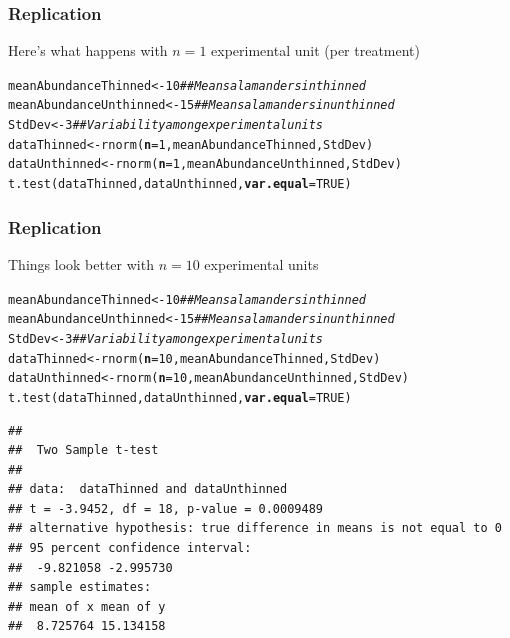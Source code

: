 \documentclass[color=usenames,dvipsnames]{beamer}\usepackage[]{graphicx}\usepackage[]{color}
\makeatletter
\newcommand{\hlnum}[1]{\textcolor[rgb]{0.69,0.494,0}{#1}}%
\newcommand{\hlcom}[1]{\textcolor[rgb]{0.514,0.506,0.514}{\textit{#1}}}%
\newcommand{\hlstd}[1]{\textcolor[rgb]{0,0,0}{#1}}%
\newcommand{\hlkwb}[1]{\textcolor[rgb]{0,0.341,0.682}{#1}}%
\newcommand{\hlkwc}[1]{\textcolor[rgb]{0,0,0}{\textbf{#1}}}%
\newcommand{\hlkwd}[1]{\textcolor[rgb]{0.004,0.004,0.506}{#1}}%
\newenvironment{kframe}{%
 \def\at@end@of@kframe{}%
 \ifinner\ifhmode%
  \def\at@end@of@kframe{\end{minipage}}%
  \begin{minipage}{\columnwidth}%
 \fi\fi%
 \def\FrameCommand##1{\hskip\@totalleftmargin \hskip-\fboxsep
 \colorbox{shadecolor}{##1}\hskip-\fboxsep
     \hskip-\linewidth \hskip-\@totalleftmargin \hskip\columnwidth}%
 \MakeFramed {\advance\hsize-\width
   \@totalleftmargin\z@ \linewidth\hsize
   \@setminipage}}%
 {\par\unskip\endMakeFramed%
 \at@end@of@kframe}
\newenvironment{knitrout}{}{} %
\makeatother
\begin{document}
\begin{frame}[fragile]
  \frametitle{Replication}
  Here's what happens with $n=1$ experimental unit (per treatment) \\
\begin{knitrout}\scriptsize
{}\color{fgcolor}\begin{kframe}
\begin{alltt}
\hlstd{meanAbundanceThinned} \hlkwb{<-} \hlnum{10}      \hlcom{## Mean salamanders in thinned}
\hlstd{meanAbundanceUnthinned} \hlkwb{<-} \hlnum{15}    \hlcom{## Mean salamanders in unthinned}
\hlstd{StdDev} \hlkwb{<-} \hlnum{3}                     \hlcom{## Variability among experimental units}
\hlstd{dataThinned} \hlkwb{<-} \hlkwd{rnorm}\hlstd{(}\hlkwc{n}\hlstd{=}\hlnum{1}\hlstd{, meanAbundanceThinned, StdDev)}
\hlstd{dataUnthinned} \hlkwb{<-} \hlkwd{rnorm}\hlstd{(}\hlkwc{n}\hlstd{=}\hlnum{1}\hlstd{, meanAbundanceUnthinned, StdDev)}
\hlkwd{t.test}\hlstd{(dataThinned, dataUnthinned,} \hlkwc{var.equal}\hlstd{=}\hlnum{TRUE}\hlstd{)}
\end{alltt}


{\ttfamily\noindent\bfseries\color{errorcolor}{\#\# Error in t.test.default(dataThinned, dataUnthinned, var.equal = TRUE): not enough observations}}\end{kframe}
\end{knitrout}
\end{frame}




\begin{frame}[fragile]
  \frametitle{Replication}
  Things look better with $n=10$ experimental units \\
\begin{knitrout}\scriptsize
{}\color{fgcolor}\begin{kframe}
\begin{alltt}
\hlstd{meanAbundanceThinned} \hlkwb{<-} \hlnum{10}      \hlcom{## Mean salamanders in thinned}
\hlstd{meanAbundanceUnthinned} \hlkwb{<-} \hlnum{15}    \hlcom{## Mean salamanders in unthinned}
\hlstd{StdDev} \hlkwb{<-} \hlnum{3}                     \hlcom{## Variability among experimental units}
\hlstd{dataThinned} \hlkwb{<-} \hlkwd{rnorm}\hlstd{(}\hlkwc{n}\hlstd{=}\hlnum{10}\hlstd{, meanAbundanceThinned, StdDev)}
\hlstd{dataUnthinned} \hlkwb{<-} \hlkwd{rnorm}\hlstd{(}\hlkwc{n}\hlstd{=}\hlnum{10}\hlstd{, meanAbundanceUnthinned, StdDev)}
\hlkwd{t.test}\hlstd{(dataThinned, dataUnthinned,} \hlkwc{var.equal}\hlstd{=}\hlnum{TRUE}\hlstd{)}
\end{alltt}
\begin{verbatim}
## 
## 	Two Sample t-test
## 
## data:  dataThinned and dataUnthinned
## t = -3.9452, df = 18, p-value = 0.0009489
## alternative hypothesis: true difference in means is not equal to 0
## 95 percent confidence interval:
##  -9.821058 -2.995730
## sample estimates:
## mean of x mean of y 
##  8.725764 15.134158
\end{verbatim}
\end{kframe}
\end{knitrout}
\end{frame}
\end{document}
